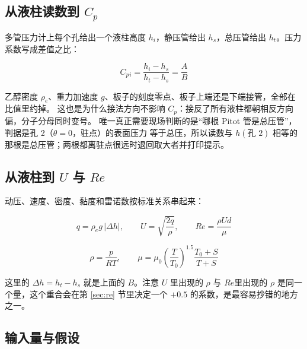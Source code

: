 \documentclass[11pt,a4paper]{ctexart}
\newcommand{\Cp}{\ensuremath{C_p}}
\newcommand{\ReD}{\ensuremath{\mathit{Re}}}
\begin{document}
\subsection{从液柱读数到 \Cp}

多管压力计上每个孔给出一个液柱高度 $h_i$，静压管给出 $h_s$，总压管给出 $h_t$。压力系数写成差值之比：

\begin{equation}
\Cp{}_i = \frac{h_i - h_s}{h_t - h_s} = \frac{A}{B}
\end{equation}

乙醇密度 $\rho_e$、重力加速度 $g$、板子的刻度零点、板子上端还是下端接管，全部在比值里约掉。
这也是为什么接法方向不影响 \Cp：接反了所有液柱都朝相反方向偏，分子分母同时变号。
唯一真正需要现场判断的是“哪根 Pitot 管是总压管”，判据是孔 2（$\theta = 0$，驻点）的表面压力
等于总压，所以读数与 $h(\text{孔 2})$ 相等的那根是总压管；两根都离驻点很远时退回取大者并打印提示。

\subsection{从液柱到 $U$ 与 \ReD}

动压、速度、密度、黏度和雷诺数按标准关系串起来：

\begin{equation}
q = \rho_e g\,|\Delta h|, \qquad U = \sqrt{\frac{2q}{\rho}}, \qquad \ReD = \frac{\rho U d}{\mu}
\end{equation}

\begin{equation}
\rho = \frac{p}{RT}, \qquad \mu = \mu_0\left(\frac{T}{T_0}\right)^{1.5}\frac{T_0 + S}{T + S}
\end{equation}

这里的 $\Delta h = h_t - h_s$ 就是上面的 $B$。注意 $U$ 里出现的 $\rho$ 与 \ReD 里出现的 $\rho$
是同一个量，这个重合会在第 \ref{sec:re} 节里决定一个 $+0.5$ 的系数，是最容易抄错的地方之一。

\subsection{输入量与假设}
\end{document}
